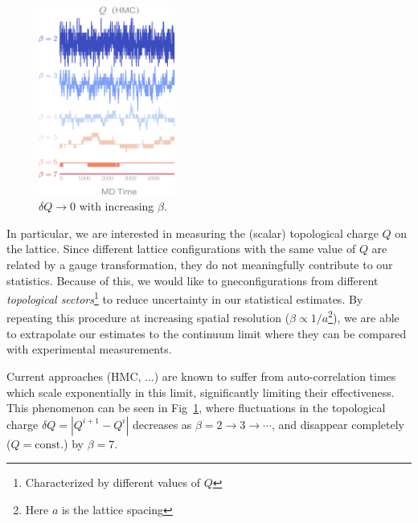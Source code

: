 \documentclass[a4paper,11pt]{article}
\begin{document}
\begin{figure}
  \begin{center}
  \caption{\label{fig:csd}$\delta Q \rightarrow 0$ with increasing $\beta$.}
  \includegraphics[width=0.40\textwidth]{assets/csd1}
  \end{center}
\end{figure}
%
In particular, we are interested in measuring the (scalar) topological charge
$Q$ on the lattice.
%
Since different lattice configurations with the same value of $Q$ are related
by a gauge transformation, they do not meaningfully contribute to our
statistics.
%
Because of this, we would like to gneconfigurations from different
\textit{topological sectors}\footnote{Characterized by different values of $Q$}
to reduce uncertainty in our statistical estimates.
%
By repeating this procedure at increasing spatial resolution ($\beta \propto 1
/ a$\footnote{Here $a$ is the lattice spacing}), we are able to extrapolate our
estimates to the continuum limit where they can be compared with experimental
measurements.
%

Current approaches (HMC, ...) are known to suffer from auto-correlation times
which scale exponentially in this limit, significantly limiting their
effectiveness.
%
This phenomenon can be seen in Fig~\ref{fig:csd}, where fluctuations in the
topological charge $\delta Q = |Q^{i + 1} - Q^{i}|$ decreases as $\beta = 2
\rightarrow 3 \rightarrow \cdots$, and disappear completely ($Q =
\mathrm{const.}$) by $\beta = 7$.
%
%
\end{document}
